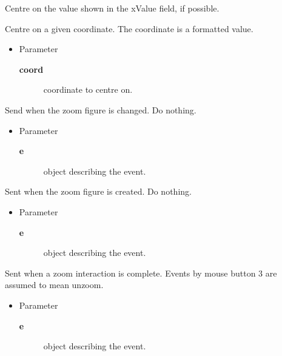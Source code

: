 \begin{desc}Centre on the value shown in the xValue field, if possible.
\end{desc}

\begin{desc}Centre on a given coordinate. The coordinate is a formatted
 value.
\begin{itemize}
\item{Parameter
  \begin{description}
   \item[\textbf{coord}]{coordinate to centre on.}
  \end{description}}
\end{itemize}
\end{desc}

\begin{desc}Send when the zoom figure is changed. Do nothing.
\begin{itemize}
\item{Parameter
  \begin{description}
   \item[\textbf{e}]{object describing the event.}
  \end{description}}
\end{itemize}
\end{desc}

\begin{desc}Sent when the zoom figure is created. Do nothing.
\begin{itemize}
\item{Parameter
  \begin{description}
   \item[\textbf{e}]{object describing the event.}
  \end{description}}
\end{itemize}
\end{desc}

\begin{desc}Sent when a zoom interaction is complete. Events by mouse
 button 3 are assumed to mean unzoom.
\begin{itemize}
\item{Parameter
  \begin{description}
   \item[\textbf{e}]{object describing the event.}
  \end{description}}
\end{itemize}
\end{desc}

